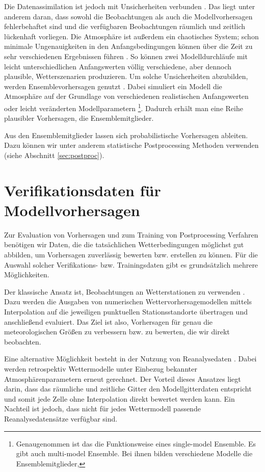 Die Datenassimilation ist jedoch mit Unsicherheiten verbunden \parencite{wergen2002datenassimilation}. Das liegt unter anderem daran, dass sowohl die Beobachtungen als auch die Modellvorhersagen fehlerbehaftet sind und die verfügbaren Beobachtungen räumlich und zeitlich lückenhaft vorliegen. Die Atmosphäre ist außerdem ein chaotisches System; schon minimale Ungenauigkeiten in den Anfangsbedingungen können über die Zeit zu sehr verschiedenen Ergebnissen führen \parencite{dwd_ensemble_vorhersage}. So können zwei Modelldurchläufe mit leicht unterschiedlichen Anfangswerten völlig verschiedene, aber dennoch plausible, Wetterszenarien produzieren. Um solche Unsicherheiten abzubilden, werden Ensemblevorhersagen genutzt \parencite{dwd_ensemble_vorhersage}. Dabei simuliert ein Modell die Atmosphäre auf der Grundlage von verschiedenen realistischen Anfangswerten oder leicht veränderten Modellparametern \footnote{Genaugenommen ist das die Funktionsweise eines single-model Ensemble. Es gibt auch multi-model Ensemble. Bei ihnen bilden verschiedene Modelle die Ensemblemitglieder,}. Dadurch erhält man eine Reihe plausibler Vorhersagen, die Ensemblemitglieder.

Aus den Ensemblemitglieder lassen sich probabilistische Vorhersagen ableiten. Dazu können wir unter anderem statistische Postprocessing Methoden verwenden (siehe Abschnitt \ref{sec:postproc}).

\section{Verifikationsdaten für Modellvorhersagen}
Zur Evaluation von Vorhersagen und zum Training von Postprocessing Verfahren benötigen wir Daten, die die tatsächlichen Wetterbedingungen möglichst gut abbilden, um Vorhersagen zuverlässig bewerten bzw. erstellen zu können. Für die Auswahl solcher Verifikations- bzw. Trainingsdaten  gibt es grundsätzlich mehrere Möglichkeiten.  

Der klassische Ansatz ist, Beobachtungen an Wetterstationen zu verwenden \parencite{gneiting2014calibration,feldmannGridStationBasedPostprocessing2019}. Dazu werden die Ausgaben von numerischen Wettervorhersagemodellen mittels Interpolation auf die jeweiligen punktuellen Stationsstandorte übertragen und anschließend evaluiert. Das Ziel ist also, Vorhersagen für genau die meteorologischen Größen zu verbessern bzw. zu bewerten, die wir direkt beobachten.

Eine alternative Möglichkeit besteht in der Nutzung von Reanalysedaten \parencite{gneiting2014calibration,feldmannGridStationBasedPostprocessing2019}. Dabei werden retrospektiv Wettermodelle unter Einbezug bekannter Atmosphärenparametern erneut gerechnet. Der Vorteil dieses Ansatzes liegt darin, dass das räumliche und zeitliche Gitter den Modellgitterdaten entspricht und somit jede Zelle ohne Interpolation direkt bewertet werden kann. Ein Nachteil ist jedoch, dass nicht für jedes Wettermodell passende Reanalysedatensätze verfügbar sind.

